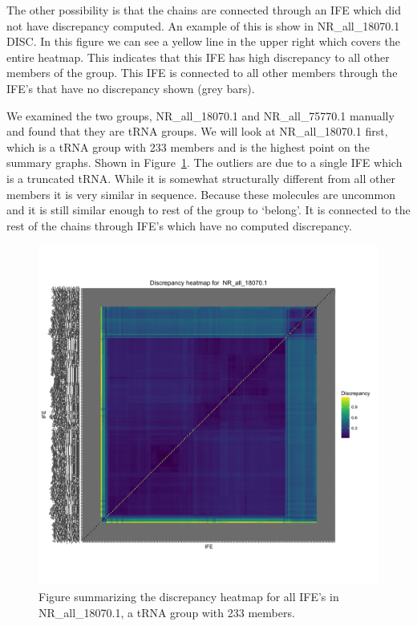 The other possibility is that the chains are connected through an IFE which did
not have discrepancy computed. An example of this is show in NR\_all\_18070.1
DISC. In this figure we can see a yellow line in the upper right which covers
the entire heatmap. This indicates that this IFE has high discrepancy to all
other members of the group. This IFE is connected to all other members through
the IFE’s that have no discrepancy shown (grey bars).

We examined the two groups, NR\_all\_18070.1 and NR\_all\_75770.1 manually and found
that they are tRNA groups. We will look at NR\_all\_18070.1 first, which is a tRNA
group with 233 members and is the highest point on the summary graphs. Shown in
Figure~\ref{fig:nr-all-18070.1-disc}. The outliers are due to a single IFE which is a
truncated tRNA. While it is somewhat structurally different from all other
members it is very similar in sequence. Because these molecules are uncommon and
it is still similar enough to rest of the group to ‘belong’. It is connected to
the rest of the chains through IFE’s which have no computed discrepancy.

\begin{figure}[h]
        \includegraphics[width=\textwidth]{chapter-3/figs/nr-all-18070-1-disc}
  \caption{Figure summarizing the discrepancy heatmap for all IFE’s in
  NR\_all\_18070.1, a tRNA group with 233 members. }
  \label{fig:nr-all-18070.1-disc}
\end{figure}

